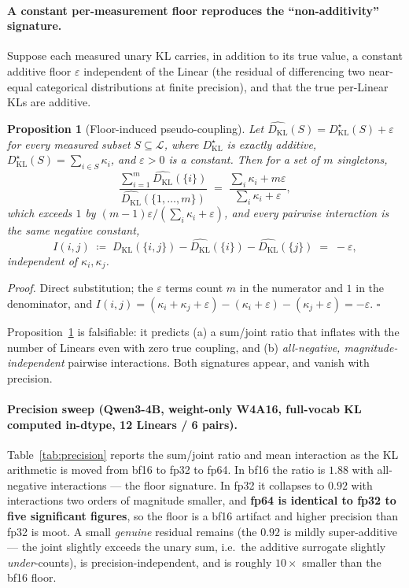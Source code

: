 \documentclass[11pt]{article}
\theoremstyle{plain}
\newtheorem{proposition}[theorem]{Proposition}
\theoremstyle{definition}
\newcommand{\kl}{D_{\mathrm{KL}}}
\newcommand{\Linears}{\mathcal{L}}
\begin{document}
\paragraph{A constant per-measurement floor reproduces the ``non-additivity''
signature.} Suppose each measured unary KL carries, in addition to its true
value, a constant additive floor $\varepsilon$ independent of the Linear (the
residual of differencing two near-equal categorical distributions at finite
precision), and that the true per-Linear KLs are additive.

\begin{proposition}[Floor-induced pseudo-coupling]\label{prop:floor}
Let $\widehat{\kl}(S) = \kl^\star(S) + \varepsilon$ for every measured subset
$S\subseteq\Linears$, where $\kl^\star$ is exactly additive,
$\kl^\star(S)=\sum_{i\in S}\kappa_i$, and $\varepsilon>0$ is a constant. Then for
a set of $m$ singletons,
\[
  \frac{\sum_{i=1}^m \widehat{\kl}(\{i\})}{\widehat{\kl}(\{1,\dots,m\})}
  \;=\; \frac{\sum_i \kappa_i + m\varepsilon}{\sum_i\kappa_i + \varepsilon},
\]
which exceeds $1$ by $(m-1)\varepsilon/(\sum_i\kappa_i+\varepsilon)$, and every
pairwise interaction is the \emph{same} negative constant,
\[
  I(i,j) \;\coloneqq\; \widehat{\kl}(\{i,j\}) - \widehat{\kl}(\{i\}) - \widehat{\kl}(\{j\})
  \;=\; -\varepsilon,
\]
independent of $\kappa_i,\kappa_j$.
\end{proposition}

\noindent\emph{Proof.} Direct substitution; the $\varepsilon$ terms count
$m$ in the numerator and $1$ in the denominator, and
$I(i,j)=(\kappa_i+\kappa_j+\varepsilon)-(\kappa_i+\varepsilon)-(\kappa_j+\varepsilon)
=-\varepsilon$. \hfill$\square$

\medskip
Proposition~\ref{prop:floor} is falsifiable: it predicts (a) a sum/joint ratio
that inflates with the number of Linears even with zero true coupling, and (b)
\emph{all-negative, magnitude-independent} pairwise interactions. Both
signatures appear, and vanish with precision.

\paragraph{Precision sweep (Qwen3-4B, weight-only W4A16, full-vocab
KL computed in-dtype, 12 Linears / 6 pairs).} Table~\ref{tab:precision} reports
the sum/joint ratio and mean interaction as the KL arithmetic is moved from bf16
to fp32 to fp64. In bf16 the ratio is $1.88$ with all-negative interactions ---
the floor signature. In fp32 it collapses to $0.92$ with interactions two orders
of magnitude smaller, and \textbf{fp64 is identical to fp32 to five significant
figures}, so the floor is a bf16 artifact and higher precision than fp32 is
moot. A small \emph{genuine} residual remains (the $0.92$ is mildly
super-additive --- the joint slightly exceeds the unary sum, i.e.\ the additive
surrogate slightly \emph{under}-counts), is precision-independent, and is roughly
$10\times$ smaller than the bf16 floor.
\end{document}
